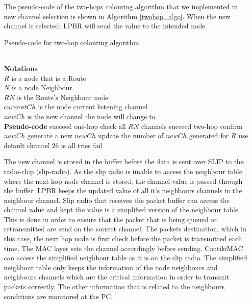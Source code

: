The pseudo-code of the two-hops colouring algorithm that we implemented in new channel selection is shown in Algorithm \ref{twohop_algo}. When the new channel is selected, LPBR will send the value to the intended node.

\begin{algorithm}
\caption{Pseudo-code for two-hop colouring algorithm}
\label{twohop_algo}
\begin{algorithmic}[]
\\\textbf{Notations}
\\$R$ is a node that is a Route
\\$N$ is a node Neighbour
\\$RN$ is the Route's Neighbour node
\\$currentCh$ is the node current listening channel
\\$newCh$ is the new channel the node will change to
\\\textbf{Pseudo-code}
		\State succeed one-hop
		\State check all $RN$ channels
			\State succeed two-hop
			\State confirm $newCh$
		\EndIf
	\Else
		\State generate a new $newCh$
		\State update the number of $newCh$ generated for $R$
		\State use default channel 26 is all tries fail
	\EndIf
\end{algorithmic}
\end{algorithm}

The new channel is stored in the buffer before the data is sent over SLIP to the radio-chip (slip-radio). As the slip radio is unable to access the neighbour table where the next hop node channel is stored, the channel value is passed through the buffer. LPBR keeps the updated value of all it's neighbours channels in the neighbour channel. Slip radio that receives the packet buffer can access the channel value and kept the value is a simplified version of the neighbour table. This is done in order to ensure that the packet that is being queued or retransmitted are send on the correct channel. The packets destination, which in this case, the next hop node is first check before the packet is transmitted each time. The MAC layer sets the channel accordingly before sending. ContikiMAC can access the simplified neighbour table as it is on the slip radio. The simplified neighbour table only keeps the information of the node neighbours and neighbours channels which are the critical information in order to transmit packets correctly. The other information that is related to the neighbours conditions are monitored at the PC. 

